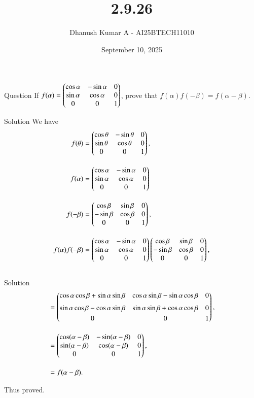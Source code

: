 \documentclass{beamer}
\title{2.9.26}
\author{Dhanush Kumar A - AI25BTECH11010}
\date{September 10, 2025}
\begin{document}
\frame{\titlepage}

\begin{frame}{Question}
If $f(\alpha) = \begin{pmatrix}\cos\alpha & -\sin\alpha & 0 \\ \sin\alpha & \cos\alpha & 0 \\ 0 & 0 & 1\end{pmatrix}$,  
prove that $f(\alpha)f(-\beta) = f(\alpha-\beta)$.

\end{frame}
\begin{frame}{Solution}
We have
\begin{align}
f(\theta) 
&= \begin{pmatrix}\cos\theta & -\sin\theta & 0 \\ \sin\theta & \cos\theta & 0 \\ 0 & 0 & 1\end{pmatrix}, \\[1em]
f(\alpha) 
	&= \begin{pmatrix}\cos\alpha & -\sin\alpha & 0 \\ \sin\alpha & \cos\alpha & 0 \\ 0 & 0 & 1\end{pmatrix}\\[1em]
f(-\beta) 
&= \begin{pmatrix}\cos\beta & \sin\beta & 0 \\ -\sin\beta & \cos\beta & 0 \\ 0 & 0 & 1\end{pmatrix}, \\[1em]
f(\alpha)f(-\beta) 
&= \begin{pmatrix}\cos\alpha & -\sin\alpha & 0 \\ \sin\alpha & \cos\alpha & 0 \\ 0 & 0 & 1\end{pmatrix}
   \begin{pmatrix}\cos\beta & \sin\beta & 0 \\ -\sin\beta & \cos\beta & 0 \\ 0 & 0 & 1\end{pmatrix}, \\[1em]
\end{align}
\end{frame}
\begin{frame}{Solution}
	\begin{align}
&= \begin{pmatrix}\cos\alpha\cos\beta + \sin\alpha\sin\beta & \cos\alpha\sin\beta - \sin\alpha\cos\beta & 0 \\[2mm]
          \sin\alpha\cos\beta - \cos\alpha\sin\beta & \sin\alpha\sin\beta + \cos\alpha\cos\beta & 0 \\[1mm]
          0 & 0 & 1\end{pmatrix}, \\[1em]
&= \begin{pmatrix}\cos(\alpha-\beta) & -\sin(\alpha-\beta) & 0 \\ \sin(\alpha-\beta) & \cos(\alpha-\beta) & 0 \\ 0 & 0 & 1\end{pmatrix}, \\[1em]
&= f(\alpha-\beta).
\end{align}

Thus proved.
\end{frame}
\end{document}
